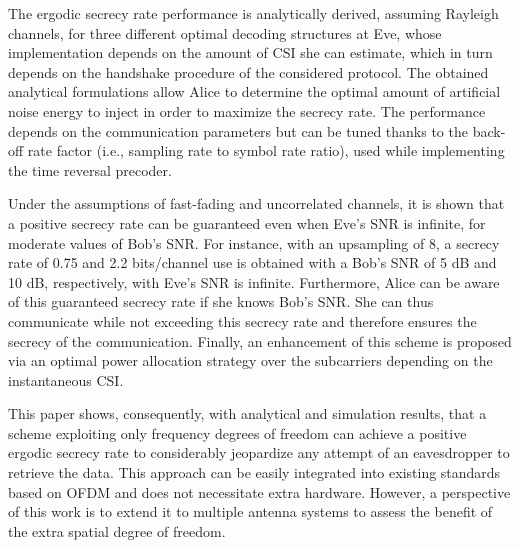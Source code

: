 \documentclass[12pt, draftclsnofoot, onecolumn]{IEEEtran}
\begin{document}
The ergodic secrecy rate performance is analytically derived, assuming Rayleigh channels, for three different optimal decoding structures at Eve, whose implementation depends on the amount of CSI she can estimate, which in turn depends on the handshake procedure of the considered protocol. The obtained analytical formulations allow Alice to determine the optimal amount of artificial noise energy to inject in order to maximize the secrecy rate. The performance depends on the communication parameters but can be tuned thanks to the back-off rate factor (i.e., sampling rate to symbol rate ratio), used while implementing the time reversal precoder.


Under the assumptions of fast-fading and uncorrelated channels, it is shown that a positive secrecy rate can be guaranteed even when Eve’s SNR is infinite, for moderate values of Bob’s SNR. For instance, with an upsampling of 8, a secrecy rate of 0.75 and 2.2 bits/channel use is obtained with a Bob’s SNR of 5 dB and 10 dB, respectively, with Eve’s SNR is infinite. Furthermore, Alice can be aware of this guaranteed secrecy rate if she knows Bob’s SNR. She can thus communicate while not exceeding this secrecy rate and therefore ensures the secrecy of the communication. Finally, an enhancement of this scheme is proposed via an optimal power allocation strategy over the subcarriers depending on the instantaneous CSI.


This paper shows, consequently, with analytical and simulation results, that a scheme exploiting only frequency degrees of freedom can achieve a positive ergodic secrecy rate to considerably jeopardize any attempt of an eavesdropper to retrieve the data. This approach can be easily integrated into existing standards based on OFDM and does not necessitate extra hardware. However, a perspective of this work is to extend it to multiple antenna systems to assess the benefit of the extra spatial degree of freedom.




%
%
\end{document}
